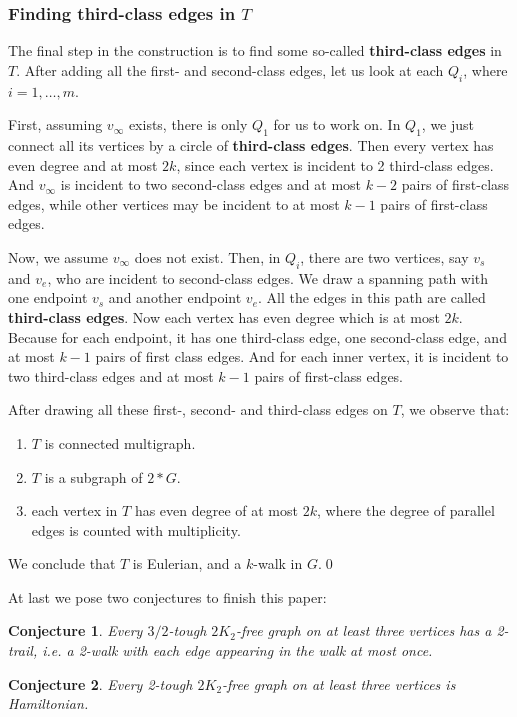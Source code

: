 \documentclass{amsart}
\newtheorem{conjecture}{Conjecture}
\begin{document}
\subsubsection{
Finding third-class edges in $T$}

The final step in the construction is to find some so-called {\bf third-class edges} in $T$. After adding all the first- and second-class edges, let us look at each $Q_i$, where $i=1,\ldots,m$.

First, assuming $v_{\infty}$ exists, there is only $Q_1$ for us to work on. In $Q_1$, we just connect all its vertices by a circle of {\bf third-class edges}. Then every vertex has even degree and at most $2k$, since each vertex is incident to 2 third-class edges. And $v_{\infty}$ is incident to two second-class edges and at most $k-2$ pairs of first-class edges, while other vertices may be incident to at most $k-1$ pairs of first-class edges.

Now, we assume $v_{\infty}$ does not exist. Then, in $Q_i$, there are two vertices, say $v_s$ and $v_e$, who are incident to second-class edges. We draw a spanning path with one endpoint $v_s$ and another endpoint $v_e$. All the edges in this path are called {\bf third-class edges}.
Now each vertex has even degree which is at most $2k$. Because for each endpoint, it has one third-class edge, one second-class edge, and at most $k-1$ pairs of first class edges. And for each inner vertex, it is incident to two third-class edges and at most $k-1$ pairs of first-class edges.



After drawing all these first-, second- and third-class edges on $T$, we observe that:
\begin{enumerate}
\item $T$ is connected multigraph.
\item $T$ is a subgraph of $2*G$.
\item each vertex in $T$ has even degree of at most $2k$, where the degree of parallel edges is counted with multiplicity.
\end{enumerate}
We conclude that $T$ is Eulerian, and a $k$-walk in $G$.\qed



At last we pose two conjectures to finish this paper:


\begin{conjecture}
Every $3/2$-tough $2K_2$-free graph on at least three vertices has a 2-trail, i.e. a 2-walk with each edge appearing in the walk at most once.
\end{conjecture}


\begin{conjecture}
Every 2-tough $2K_2$-free graph on at least three vertices is Hamiltonian.
\end{conjecture}



























\end{document}
